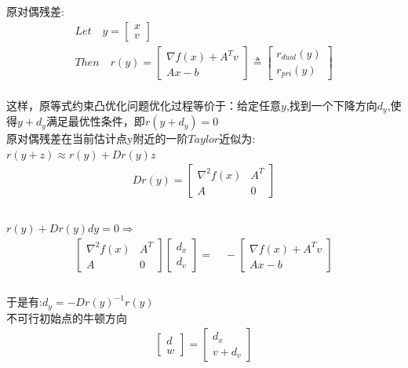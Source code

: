 \documentclass{article}
\begin{document}
原对偶残差:\\
$$\begin{gathered}
    Let \quad y = \left[
        \begin{array}{cccc}
            x\\
            v 
        \end{array} 
    \right]\\
    Then \quad r(y) = \left[
        \begin{array}{cccc}
            \nabla f(x) + A^Tv\\
            Ax - b
        \end{array} 
    \right]
    \triangleq
    \left[
        \begin{array}{cccc}
            r_{dual}(y)\\
            r_{pri}(y)
        \end{array} 
    \right]
\end{gathered}
$$\\
这样，原等式约束凸优化问题优化过程等价于：给定任意$y$,找到一个下降方向$d_y$,使得$y + d_y$满足最优性条件，即$r(y+ d_y) = 0$\\
原对偶残差在当前估计点y附近的一阶$Taylor$近似为:$r(y+z) \approx r(y) + Dr(y)z$
$$\begin{gathered}
    Dr(y) = \left[
        \begin{array}{cccc}
            \nabla^2 f(x) & A^T\\
            A & 0 
        \end{array} 
    \right]\\
\end{gathered}
$$\\
$r(y) + Dr(y)dy = 0 \Rightarrow $
$$\begin{gathered}
    \left[
        \begin{array}{cccc}
            \nabla^2 f(x) & A^T\\
            A & 0 
        \end{array} 
    \right]
    \left[
        \begin{array}{cccc}
            d_x\\
            d_v 
        \end{array} 
    \right]
    =\quad -
    \left[
        \begin{array}{cccc}
            \nabla f(x)  + A^Tv\\
            Ax-b
        \end{array} 
    \right]\\
\end{gathered}
$$\\
于是有:$d_y = -Dr(y)^{-1}r(y)$\\
不可行初始点的牛顿方向
$$
\begin{gathered}
    \left[
        \begin{array}{cccc}
            d\\
            w 
        \end{array} 
    \right]
    = 
    \left[
        \begin{array}{cccc}
            d_x\\
            v + d_v
        \end{array} 
    \right]
\end{gathered}
$$
\end{document}
